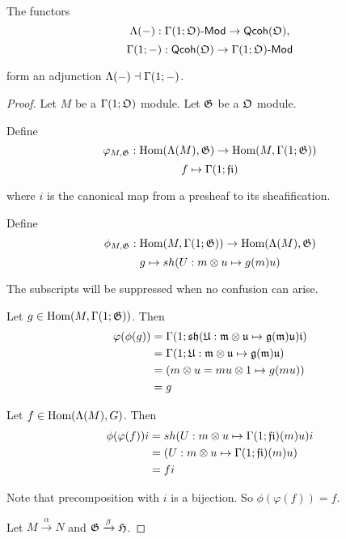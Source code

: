



\begin{lemma}
The functors 
\[\stilde{\blank}: \modules{\globalsections{O}} \rightarrow \qcoh{O},\]
\[\globalsections{\blank}: \qcoh{O} \rightarrow \modules{\globalsections{O}}\]

form an adjunction $\adjunction{\stilde{\blank}}{\globalsections{\blank}}$.
\end{lemma}

\begin{proof}
Let $M$ be a $\globalsections{O}$ module.
Let $\mathfrak{G}$ be a $\mathfrak{O}$ module.

Define 
\[\varphi_{M,\module{G}}: \Hom{\stilde{M}}{\module{G}} \rightarrow \Hom{M}{\globalsections{G}}\]
\[ f \mapsto \globalsections{fi}\]

where $i$ is the canonical map from a presheaf to its sheafification.

Define 
\[\phi_{M,\module{G}}: \Hom{M}{\globalsections{G}} \rightarrow \Hom{\stilde{M}}{\module{G}}\]
\[ g \mapsto \sheafify{U: m\tensor u \mapsto g(m)u}\]

The subscripts will be suppressed when no confusion can arise.

Let $g\in \Hom{M}{\globalsections{G}}$. 
Then 
\begin{align*}
\varphi(\phi(g)) &= \globalsections{\sheafify{U: m\tensor u \mapsto g(m)u}i} \\
&= \globalsections{U: m\tensor u \mapsto g(m)u} \\
&= (m \tensor u = mu \tensor 1 \mapsto g(mu)) \\
&= g
\end{align*}

Let $f\in \Hom{\stilde{M}}{G}$. 
Then 
\begin{align*}
\phi(\varphi(f))i &= \sheafify{U: m\tensor u \mapsto \globalsections{fi}(m)u}i \\
&= (U: m\tensor u \mapsto \globalsections{fi}(m)u) \\
&= fi
\end{align*}

Note that precomposition with $i$ is a bijection. So $\phi(\varphi(f)) = f$.


Let $M\xrightarrow{\alpha} N$ and $\mathfrak{G}\xrightarrow{\beta} \mathfrak{H}$.



\end{proof}

